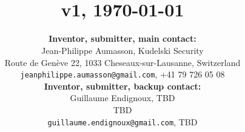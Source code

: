 
\title{
\Huge{\gravity} \\[0.15cm]
\large{v1}, \today
}

\author{
\textbf{Inventor, submitter, main contact:}  \\[0.15cm]
Jean-Philippe Aumasson, Kudelski Security \\[0.15cm]
Route de Genève 22, 1033 Cheseaux-sur-Lausanne, Switzerland \\[0.15cm]
\texttt{jeanphilippe.aumasson@gmail.com}, +41 79 726 05 08 \\[0.5cm]
\textbf{Inventor, submitter, backup contact:}  \\[0.15cm]
Guillaume Endignoux, TBD \\[0.15cm]
TBD \\[0.15cm]
\texttt{guillaume.endignoux@gmail.com}, TBD \\[0.5cm]
}

\date{}

\maketitle

